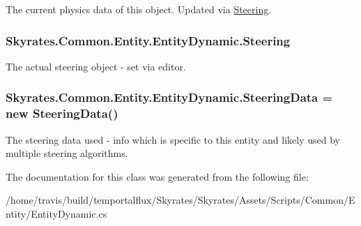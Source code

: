 The current physics data of this object. Updated via \hyperlink{class_skyrates_1_1_common_1_1_entity_1_1_entity_dynamic_a8d35984946a298623b4de895873de43b}{Steering}. 

\hypertarget{class_skyrates_1_1_common_1_1_entity_1_1_entity_dynamic_a8d35984946a298623b4de895873de43b}{
\subsubsection[{Steering}]{ Skyrates.\-Common.\-Entity.\-Entity\-Dynamic.\-Steering}}\label{class_skyrates_1_1_common_1_1_entity_1_1_entity_dynamic_a8d35984946a298623b4de895873de43b}


The actual steering object -\/ set via editor. 

\hypertarget{class_skyrates_1_1_common_1_1_entity_1_1_entity_dynamic_a60e4edbed3f02c3ba4a7c6150fbad90e}{
\subsubsection[{Steering\-Data}]{ Skyrates.\-Common.\-Entity.\-Entity\-Dynamic.\-Steering\-Data = new {\bf Steering\-Data}()}}\label{class_skyrates_1_1_common_1_1_entity_1_1_entity_dynamic_a60e4edbed3f02c3ba4a7c6150fbad90e}


The steering data used -\/ info which is specific to this entity and likely used by multiple steering algorithms. 



The documentation for this class was generated from the following file\-:\begin{DoxyCompactItemize}
\item 
/home/travis/build/temportalflux/\-Skyrates/\-Skyrates/\-Assets/\-Scripts/\-Common/\-Entity/Entity\-Dynamic.\-cs\end{DoxyCompactItemize}
